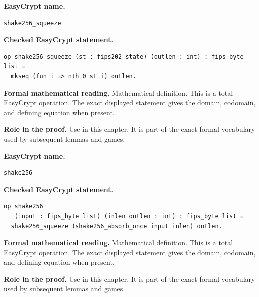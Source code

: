 \begin{formaldefinition}
\noindent\textbf{EasyCrypt name.}
\begin{lstlisting}[language=EasyCrypt,basicstyle=\ttfamily\scriptsize]
shake256_squeeze
\end{lstlisting}
\noindent\textbf{Checked EasyCrypt statement.}
\begin{lstlisting}[language=EasyCrypt,basicstyle=\ttfamily\scriptsize]
op shake256_squeeze (st : fips202_state) (outlen : int) : fips_byte list =
  mkseq (fun i => nth 0 st i) outlen.
\end{lstlisting}
\noindent\textbf{Formal mathematical reading.}
Mathematical definition. This is a total EasyCrypt operation.  The exact displayed statement gives the domain, codomain, and defining equation when present.

\noindent\textbf{Role in the proof.}
Use in this chapter. It is part of the exact formal vocabulary used by subsequent lemmas and games.

\end{formaldefinition}

\begin{formaldefinition}
\noindent\textbf{EasyCrypt name.}
\begin{lstlisting}[language=EasyCrypt,basicstyle=\ttfamily\scriptsize]
shake256
\end{lstlisting}
\noindent\textbf{Checked EasyCrypt statement.}
\begin{lstlisting}[language=EasyCrypt,basicstyle=\ttfamily\scriptsize]
op shake256
   (input : fips_byte list) (inlen outlen : int) : fips_byte list =
  shake256_squeeze (shake256_absorb_once input inlen) outlen.
\end{lstlisting}
\noindent\textbf{Formal mathematical reading.}
Mathematical definition. This is a total EasyCrypt operation.  The exact displayed statement gives the domain, codomain, and defining equation when present.

\noindent\textbf{Role in the proof.}
Use in this chapter. It is part of the exact formal vocabulary used by subsequent lemmas and games.

\end{formaldefinition}

